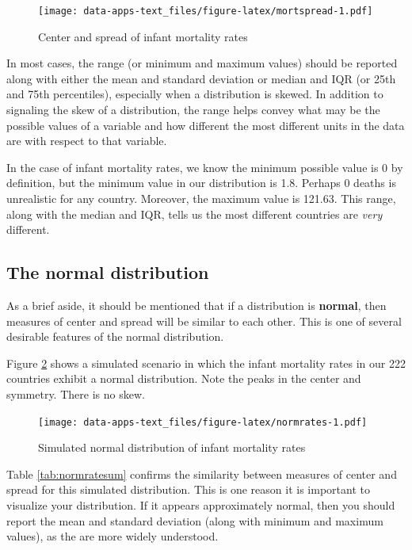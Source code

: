 \documentclass[
]{book}
\begin{document}
\begin{figure}
\centering
\texttt{[image: data-apps-text\_files/figure-latex/mortspread-1.pdf]}
\caption{\label{fig:mortspread}Center and spread of infant mortality rates}
\end{figure}

In most cases, the range (or minimum and maximum values) should be reported along with either the mean and standard deviation or median and IQR (or 25th and 75th percentiles), especially when a distribution is skewed. In addition to signaling the skew of a distribution, the range helps convey what may be the possible values of a variable and how different the most different units in the data are with respect to that variable.

In the case of infant mortality rates, we know the minimum possible value is 0 by definition, but the minimum value in our distribution is 1.8. Perhaps 0 deaths is unrealistic for any country. Moreover, the maximum value is 121.63. This range, along with the median and IQR, tells us the most different countries are \emph{very} different.

\hypertarget{the-normal-distribution}{%
\subsection{The normal distribution}\label{the-normal-distribution}}

As a brief aside, it should be mentioned that if a distribution is \textbf{normal}, then measures of center and spread will be similar to each other. This is one of several desirable features of the normal distribution.

Figure \ref{fig:normrates} shows a simulated scenario in which the infant mortality rates in our 222 countries exhibit a normal distribution. Note the peaks in the center and symmetry. There is no skew.

\begin{figure}
\centering
\texttt{[image: data-apps-text\_files/figure-latex/normrates-1.pdf]}
\caption{\label{fig:normrates}Simulated normal distribution of infant mortality rates}
\end{figure}

Table \ref{tab:normratesum} confirms the similarity between measures of center and spread for this simulated distribution. This is one reason it is important to visualize your distribution. If it appears approximately normal, then you should report the mean and standard deviation (along with minimum and maximum values), as the are more widely understood.
\end{document}
